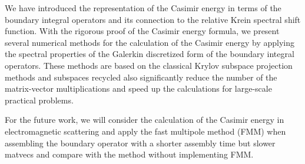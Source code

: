 We have introduced the representation of the Casimir energy in terms of the boundary integral operators and its connection to the relative Krein spectral shift 
function. With the rigorous proof of the Casimir energy formula, we present several numerical methods for 
the calculation of the Casimir energy by applying the spectral properties of the Galerkin discretized form of the boundary 
integral operators. These methods are based on the classical Krylov subspace projection methods and subspaces recycled also significantly reduce the number of the matrix-vector 
multiplications and speed up the calculations for large-scale practical problems. 

For the future work, we will consider the calculation of the Casimir energy in electromagnetic scattering and apply the fast multipole method (FMM) 
when assembling the boundary operator with a shorter assembly time but slower matvecs and compare with the method without implementing FMM.